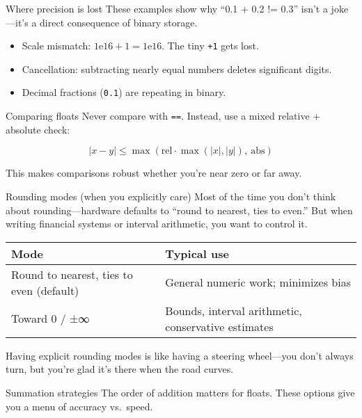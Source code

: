 \documentclass[
  letterpaper,
  DIV=11,
  numbers=noendperiod]{scrreprt}
\providecommand{\tightlist}{%
  \setlength{\itemsep}{0pt}\setlength{\parskip}{0pt}}
\begin{document}
Where precision is lost These examples show why ``0.1 + 0.2 != 0.3''
isn't a joke---it's a direct consequence of binary storage.

\begin{itemize}
\tightlist
\item
  Scale mismatch: \(1\text{e}16 + 1 = 1\text{e}16\). The tiny
  \texttt{+1} gets lost.
\item
  Cancellation: subtracting nearly equal numbers deletes significant
  digits.
\item
  Decimal fractions (\texttt{0.1}) are repeating in binary.
\end{itemize}

Comparing floats Never compare with \texttt{==}. Instead, use a mixed
relative + absolute check:

\[
|x-y| \le \max(\text{rel}\cdot\max(|x|,|y|),\ \text{abs})
\]

This makes comparisons robust whether you're near zero or far away.

Rounding modes (when you explicitly care) Most of the time you don't
think about rounding---hardware defaults to ``round to nearest, ties to
even.'' But when writing financial systems or interval arithmetic, you
want to control it.

\begin{longtable}[]{@{}
  >{\raggedright\arraybackslash}p{}
  >{\raggedright\arraybackslash}p{}@{}}
\toprule\noalign{}
\begin{minipage}[b]{\linewidth}\raggedright
Mode
\end{minipage} & \begin{minipage}[b]{\linewidth}\raggedright
Typical use
\end{minipage} \\
\midrule\noalign{}
\endhead
\bottomrule\noalign{}
\endlastfoot
Round to nearest, ties to even (default) & General numeric work;
minimizes bias \\
Toward 0 / ±∞ & Bounds, interval arithmetic, conservative estimates \\
\end{longtable}

Having explicit rounding modes is like having a steering wheel---you
don't always turn, but you're glad it's there when the road curves.

Summation strategies The order of addition matters for floats. These
options give you a menu of accuracy vs.~speed.
\end{document}
